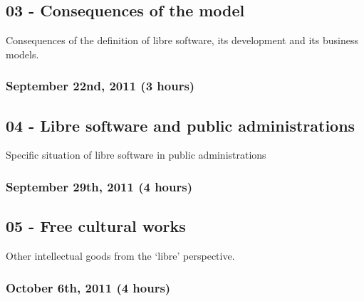\documentclass[a4paper]{article}
\begin{document}
\subsection{03 - Consequences of the model}

Consequences of the definition of libre software, its development and its business models.


\subsubsection{September 22nd, 2011 (3 hours)}


\subsection{04 - Libre software and public administrations}

Specific situation of libre software in public administrations

\subsubsection{September 29th, 2011 (4 hours)}

\subsection{05 - Free cultural works}

Other intellectual goods from the `libre' perspective.


\subsubsection{October 6th, 2011 (4 hours)}
\end{document}

